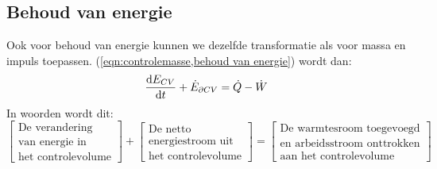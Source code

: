 			\subsection{Behoud van energie}
			\label{sec:Behoud van energie}
Ook voor behoud van energie kunnen we dezelfde transformatie als voor massa en impuls toepassen. (\ref{eqn:controlemasse,behoud van energie}) wordt dan:
\begin{equation}
	\frac{\mathrm{d} E_{CV}}{\mathrm{d} t} + \dot{E}_{\partial CV} =  \dot{Q}-\dot{W}
	\label{eqn:controlevolume,behoud van energie}
\end{equation}
In woorden wordt dit:
\begin{equation}
	\left[
		\begin{array}{c}
			\mbox{De verandering} \\ \mbox{van energie in} \\ \mbox{het controlevolume}
		\end{array}
	\right]
	+
	\left[
		\begin{array}{c}
			\mbox{De netto} \\ \mbox{energiestroom uit} \\ \mbox{het controlevolume}
		\end{array}
	\right]
	=
	\left[
		\begin{array}{c}
			\mbox{De warmtesroom toegevoegd} \\ \mbox{en arbeidsstroom onttrokken} \\ \mbox{aan het controlevolume}
		\end{array}
	\right]
	\label{eqn:controlevolume,behoud van energie,woorden}
\end{equation}

	\FloatBarrier
